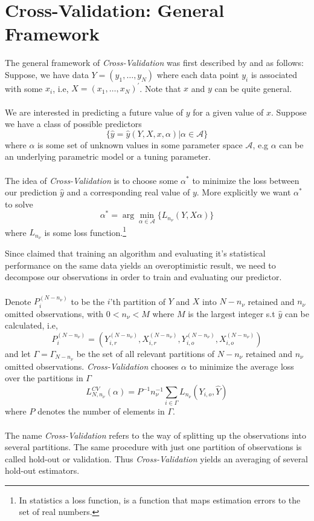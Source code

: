 \documentclass[Research_Module_ES.tex]{subfiles}
\begin{document}
\section{Cross-Validation: General Framework}
The general framework of \textit{Cross-Validation} was first described by \cite{stone1974cross} and  \cite{geisser1975predictive} as follows: \\

Suppose, we have data $Y=(y_1,\ldots,y_N)$ where each data point $y_i$ is associated with some $x_i$, i.e, $X=(x_1,\ldots,x_N)^\prime$. Note that $x$ and $y$ can be quite general.\\
\\
We are interested in predicting a future value of $y$ for a given value of $x$. Suppose we have a class of possible predictors 
\[
	\{\hat{y}=\hat{y}(Y,X,x,\alpha)|\alpha\in\mathscr{A}\}
\]
where $\alpha$ is some set of unknown values in some parameter space $\mathscr{A}$, e.g $\alpha$ can be an underlying parametric model or a tuning parameter.\\
\\
The idea of \textit{Cross-Validation} is to choose some $\alpha^\ast$ to minimize the loss between our prediction $\hat{y}$ and a corresponding real value of $y$. More explicitly we want $\alpha^\ast$ to solve
\[
	\alpha^\ast=\arg\min_{\alpha\in\mathscr{A}}\{L_{n_\nu}(Y,X\alpha)\}
\]
where $L_{n_\nu}$ is some loss function.\footnote{In statistics a loss function, is a function that maps estimation errors to the set of real numbers.  }
 
Since \cite{larson1931shrinkage} claimed that training an algorithm and evaluating it's statistical performance on the same data yields an overoptimistic result, we need to decompose our observations in order to train and evaluating our predictor. \\
\\
Denote $P^{(N-n_\nu)}_i$ to be the $i$'th partition of $Y$ and $X$ into $N-n_\nu$ retained and $n_\nu$ omitted observations, with $0<n_\nu<M$ where $M$ is the largest integer s.t $\hat{y}$ can be calculated, i.e,
\[
	P^{(N-n_\nu)}_i=(Y_{i,r}^{(N-n_\nu)},X_{i,r}^{(N-n_\nu)},Y_{i,o}^{(N-n_\nu)},X_{i,o}^{(N-n_\nu)})
\]
and let $\Gamma=\Gamma_{N-n_\nu}$ be the set of all relevant partitions of $N-n_\nu$ retained and $n_\nu$ omitted observations. \textit{Cross-Validation} chooses $\alpha$ to minimize the average loss over the partitions in $\Gamma$ 
\[
	L_{N,n_\nu}^{CV}(\alpha)=P^{-1}n_\nu^{-1}\sum_{i\in\Gamma}L_{n_\nu}(Y_{i,o},\hat{Y})
\]
where $P$ denotes the number of elements in $\Gamma$.\\
\\
The name \textit{Cross-Validation} refers to the way of splitting up the observations into several partitions. The same procedure with just one partition of observations is called hold-out or validation. Thus \textit{Cross-Validation} yields an averaging of several hold-out estimators.
\end{document}
